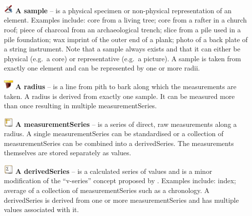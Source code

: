\begin{description}
\item \includegraphics[width=5mm]{../src/edu/cornell/dendro/corina_resources/Icons/48x48/sample.png} \textbf{A sample} -- is a physical specimen or non-physical representation of an element. Examples include: core from a living tree; core from a rafter in a church roof; piece of charcoal from an archaeological trench; slice from a pile used in a pile foundation; wax imprint of the outer end of a plank; photo of a back plate of a string instrument. Note that a sample always exists and that it can either be physical (e.g.\ a core) or representative (e.g.\ a picture). A sample is taken from exactly one element and can be represented by one or more radii.

\item \includegraphics[width=5mm]{../src/edu/cornell/dendro/corina_resources/Icons/48x48/radius.png} \textbf{A radius} --  is a line from pith to bark along which the measurements are taken. A radius is derived from exactly one sample. It can be measured more than once resulting in multiple measurementSeries.

\item \includegraphics[width=5mm]{../src/edu/cornell/dendro/corina_resources/Icons/48x48/measurementseries.png} \textbf{A measurementSeries} -- is a series of direct, raw measurements along a radius. A single measurementSeries can be standardised or a collection of measurementSeries can be combined into a derivedSeries.  The measurements themselves are stored separately as values.

\item \includegraphics[width=5mm]{../src/edu/cornell/dendro/corina_resources/Icons/48x48/derivedseries.png} \textbf{A derivedSeries} -- is a calculated series of values and is a minor modification of the ``v-series'' concept proposed by \cite{corina}.  Examples include: index; average of a collection of measurementSeries such as a chronology. A derivedSeries is derived from one or more measurementSeries and has multiple values associated with it.


\end{description}
